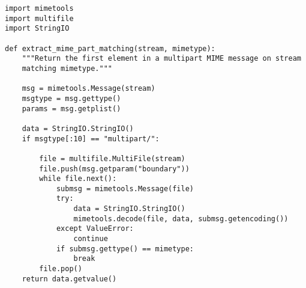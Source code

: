 \begin{verbatim}
import mimetools
import multifile
import StringIO

def extract_mime_part_matching(stream, mimetype):
    """Return the first element in a multipart MIME message on stream
    matching mimetype."""

    msg = mimetools.Message(stream)
    msgtype = msg.gettype()
    params = msg.getplist()

    data = StringIO.StringIO()
    if msgtype[:10] == "multipart/":

        file = multifile.MultiFile(stream)
        file.push(msg.getparam("boundary"))
        while file.next():
            submsg = mimetools.Message(file)
            try:
                data = StringIO.StringIO()
                mimetools.decode(file, data, submsg.getencoding())
            except ValueError:
                continue
            if submsg.gettype() == mimetype:
                break
        file.pop()
    return data.getvalue()
\end{verbatim}
